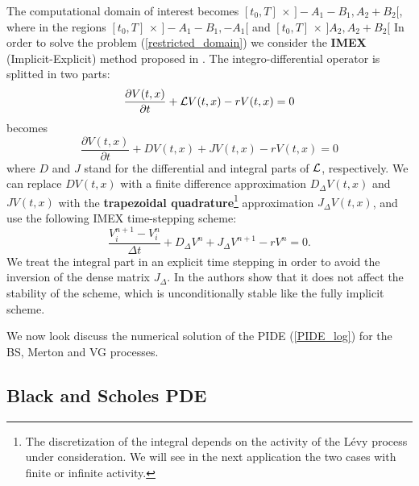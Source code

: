 The computational domain of interest becomes $[t_0,T]\, \times \, ]-A_1-B_1,A_2+B_2[$, where in the regions $[t_0,T]\, \times \, ]-A_1-B_1,-A_1[$ and 
$[t_0,T]\, \times \, ]A_2,A_2+B_2[$
In order to solve the problem (\ref{restricted_domain}) we consider the \textbf{IMEX} (Implicit-Explicit) method proposed in \cite{CoVo05b}.
The integro-differential operator is splitted in two parts:
$$ \frac{\partial V(t,x)}{\partial t} + \mathcal{L} V(t,x) -r V(t,x) = 0 $$
becomes
$$ \frac{\partial V(t,x)}{\partial t} + D V(t,x) + J V(t,x) -r V(t,x) = 0 $$
where $D$ and $J$ stand for the differential and integral parts of $\mathcal{L}$, respectively. We can replace $D V(t,x)$ with a finite difference approximation $D_{\Delta} V(t,x)$ 
and $J V(t,x)$
with the \textbf{trapezoidal quadrature}\footnote{The discretization of the integral depends on the activity of the Lévy process under consideration.
We will see in the next application the two cases with finite or infinite activity.} approximation $J_{\Delta} V(t,x)$, and use the following IMEX time-stepping scheme:
\begin{equation}
 \frac{V^{n+1}_{i} -V^{n}_{i}}{\Delta t} + D_{\Delta} V^{n} + J_{\Delta} V^{n+1} - r V^{n} = 0. 
\end{equation}
We treat the integral part in an explicit time stepping in order to avoid the inversion of the dense matrix $J_{\Delta}$. 
In \cite{CoVo05b} the authors show that it does not affect the stability of the scheme, which is unconditionally stable like the fully implicit scheme.

We now look discuss the numerical solution of the PIDE (\ref{PIDE_log}) for the BS, Merton and VG processes. 


\subsection{Black and Scholes PDE}

